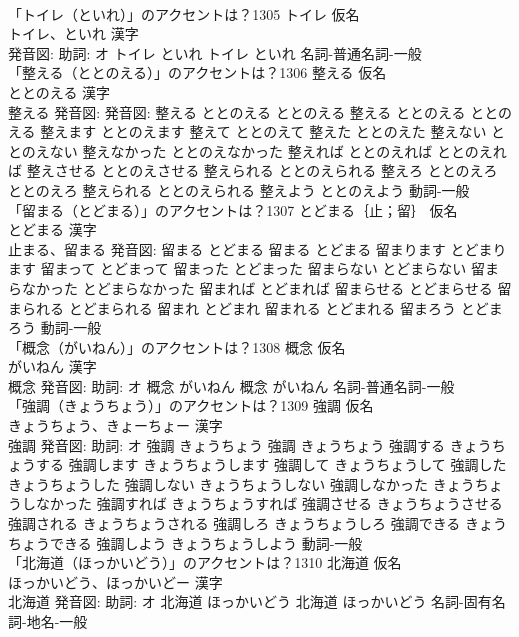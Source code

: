\documentclass[8pt]{extreport}
\begin{document}
\begin{CJK}{UTF8}{min}
\\	「トイレ（といれ）」のアクセントは？1305	トイレ 仮名　
\\	トイレ、といれ 漢字　
\\	発音図: 助詞: オ	トイレ といれ		トイレ といれ				名詞-普通名詞-一般 
\\	「整える（ととのえる）」のアクセントは？1306	整える 仮名　
\\	ととのえる 漢字　
\\	整える 発音図: 発音図:	整える ととのえる ととのえる		整える ととのえる ととのえる 整えます ととのえます 整えて ととのえて 整えた ととのえた 整えない ととのえない 整えなかった ととのえなかった 整えれば ととのえれば ととのえれば 整えさせる ととのえさせる 整えられる ととのえられる 整えろ ととのえろ ととのえろ 整えられる ととのえられる 整えよう ととのえよう				動詞-一般 
\\	「留まる（とどまる）」のアクセントは？1307	とどまる｛止；留｝ 仮名　
\\	とどまる 漢字　
\\	止まる、留まる 発音図:	留まる とどまる		留まる とどまる 留まります とどまります 留まって とどまって 留まった とどまった 留まらない とどまらない 留まらなかった とどまらなかった 留まれば とどまれば 留まらせる とどまらせる 留まられる とどまられる 留まれ とどまれ 留まれる とどまれる 留まろう とどまろう				動詞-一般 
\\	「概念（がいねん）」のアクセントは？1308	概念 仮名　
\\	がいねん 漢字　
\\	概念 発音図: 助詞: オ	概念 がいねん		概念 がいねん				名詞-普通名詞-一般 
\\	「強調（きょうちょう）」のアクセントは？1309	強調 仮名　
\\	きょうちょう、きょーちょー 漢字　
\\	強調 発音図: 助詞: オ	強調 きょうちょう		強調 きょうちょう 強調する きょうちょうする 強調します きょうちょうします 強調して きょうちょうして 強調した きょうちょうした 強調しない きょうちょうしない 強調しなかった きょうちょうしなかった 強調すれば きょうちょうすれば 強調させる きょうちょうさせる 強調される きょうちょうされる 強調しろ きょうちょうしろ 強調できる きょうちょうできる 強調しよう きょうちょうしよう				動詞-一般 
\\	「北海道（ほっかいどう）」のアクセントは？1310	北海道 仮名　
\\	ほっかいどう、ほっかいどー 漢字　
\\	北海道 発音図: 助詞: オ	北海道 ほっかいどう		北海道 ほっかいどう				名詞-固有名詞-地名-一般 

\end{CJK}
\end{document}
